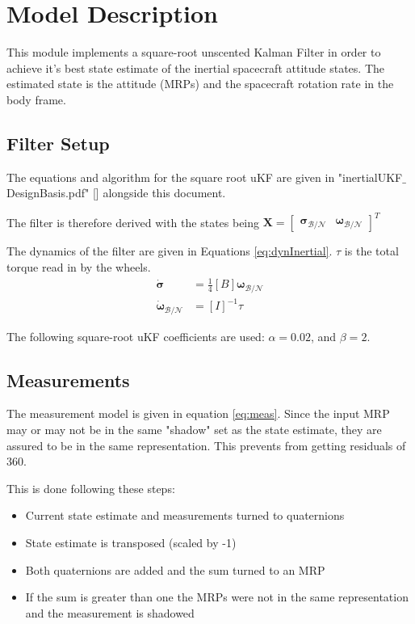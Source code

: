 
\section{Model Description}

This module implements a square-root unscented Kalman Filter in order to achieve it's best state estimate of the inertial spacecraft attitude states. The estimated state is the attitude (MRPs) and the spacecraft rotation rate in the body frame. 

\subsection{Filter Setup} %

The equations and algorithm for the square root uKF are given in "inertialUKF$\_$DesignBasis.pdf" [] alongside this document.

The filter is therefore derived with the states being $\bm X =\begin{bmatrix} \bm \sigma_{\mathcal{B}/\mathcal{N}}& \bm \omega_{\mathcal{B}/\mathcal{N}} \end{bmatrix}^{T}$

The dynamics of the filter are given in Equations \eqref{eq:dynInertial}. $\tau$ is the total torque read in by the wheels. 
\begin{align}
\label{eq:dynInertial}
\dot{\bm \sigma} &= \frac{1}{4} [B] \bm \omega_{\mathcal{B}/\mathcal{N}} \\
\dot{\bm \omega}_{\mathcal{B}/\mathcal{N}} & = [I]^{-1} \tau
\end{align}

The following square-root uKF coefficients are used: $\alpha = 0.02$, and $\beta = 2$. 


\subsection{Measurements}

The measurement model is given in equation \ref{eq:meas}. Since the input MRP may or may not be in the same "shadow" set as the state estimate, they are assured to be in the same representation. This prevents from getting residuals of 360\dg. 

This is done following these steps:

\begin{itemize}
\item Current state estimate and measurements turned to quaternions
\item State estimate is transposed (scaled by -1)
\item Both quaternions are added and the sum turned to an MRP
\item If the sum is greater than one the MRPs were not in the same representation and the measurement is shadowed
\end{itemize}

